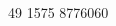 \documentclass[michiscolours]{hipstercv}
\newlength{\rightcolwidth}
\begin{document}
\begin{paracol}{2}
\begin{minipage}[t]{\rightcolwidth}
\begin{center}
{ 49 1575 8776060 
}
\end{center}
\end{minipage}

\newpage

\end{paracol}
\end{document}
